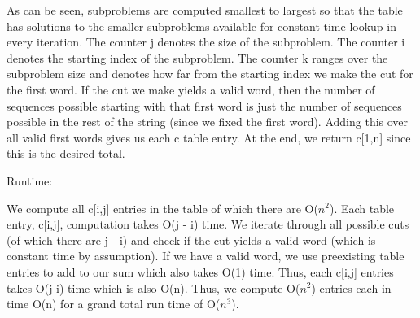 \documentclass[11pt,a4paper]{article}
\begin{document}
As can be seen, subproblems are computed smallest to largest so that the table has solutions to the smaller subproblems available for constant time lookup in every iteration. The counter j denotes the size of the subproblem. The counter i denotes the starting index of the subproblem. The counter k ranges over the subproblem size and denotes how far from the starting index we make the cut for the first word. If the cut we make yields a valid word, then the number of sequences possible starting with that first word is just the number of sequences possible in the rest of the string (since we fixed the first word). Adding this over all valid first words gives us each c table entry. At the end, we return c[1,n] since this is the desired total. 

Runtime:

We compute all c[i,j] entries in the table of which there are O($n^{2}$). Each table entry, c[i,j], computation takes O(j - i) time. We iterate through all possible cuts (of which there are j - i) and check if the cut yields a valid word (which is constant time by assumption). If we have a valid word, we use preexisting table entries to add to our sum which also takes O(1) time. Thus, each c[i,j] entries takes O(j-i) time which is also O(n). Thus, we compute O($n^{2}$) entries each in time O(n) for a grand total run time of O($n^{3}$).
\end{document}
